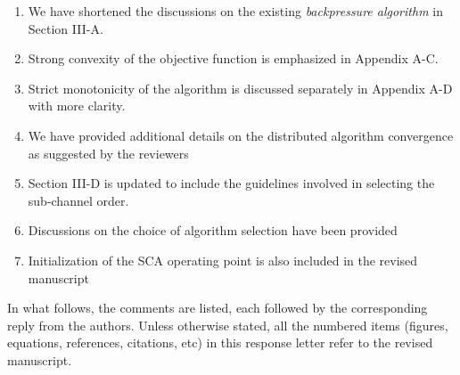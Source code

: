 \begin{enumerate}
\item We have shortened the discussions on the existing \textit{backpressure algorithm} in Section III-A.
\item Strong convexity of the objective function is emphasized in Appendix A-C.
\item Strict monotonicity of the algorithm is discussed separately in Appendix A-D with more clarity.
\item We have provided additional details on the distributed algorithm convergence as suggested by the reviewers
\item Section III-D is updated to include the guidelines involved in selecting the sub-channel order.
\item Discussions on the choice of algorithm selection have been provided 
\item Initialization of the \ac{SCA} operating point is also included in the revised manuscript
\end{enumerate}

In what follows, the comments are listed, each followed by the corresponding reply from the authors. Unless otherwise stated, all the numbered items (figures, equations, references, citations, etc) in this response letter refer to the revised manuscript.